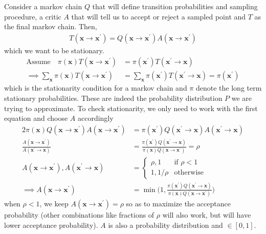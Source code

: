 \documentclass[../../statistical_learning_notes.tex]{subfiles}
\begin{document}
Consider a markov chain $Q$ that will define transition probabilities and sampling procedure, a critic $A$ that will tell us to accept or reject a sampled point and $T$ as the final markov chain. Then,
\begin{align*}
    T(\bm{x}\rightarrow \bm{x}^{\prime}) = Q(\bm{x} \rightarrow \bm{x}^{\prime})A(\bm{x} \rightarrow \bm{x}^{\prime})
\end{align*}
which we want to be stationary.
\begin{align*}
    \text{Assume} \quad \pi(\bm{x})T(\bm{x} \rightarrow \bm{x}^{\prime}) &= \pi(\bm{x}^{\prime})T(\bm{x}^{\prime} \rightarrow \bm{x})\\
    \implies \sum_{\bm{x}} \pi(\bm{x})T(\bm{x} \rightarrow \bm{x}^{\prime}) &= \sum_{\bm{x}} \pi(\bm{x}^{\prime})T(\bm{x}^{\prime} \rightarrow \bm{x}) = \pi(\bm{x}^{\prime})
\end{align*}
which is the stationarity condition for a markov chain and $\pi$ denote the long term stationary probabilities. These are indeed the probability distribution $P$ we are trying to approximate. To check stationarity, we only need to work with the first equation and choose $A$ accordingly
\begin{alignat*}{2}
    \pi(\bm{x})Q(\bm{x} \rightarrow \bm{x}^{\prime})A(\bm{x} \rightarrow \bm{x}^{\prime}) &= \pi(\bm{x}^{\prime})Q(\bm{x}^{\prime} \rightarrow \bm{x})A(\bm{x}^{\prime} \rightarrow \bm{x})\\
    \frac{A(\bm{x} \rightarrow \bm{x}^{\prime})}{A(\bm{x}^{\prime} \rightarrow \bm{x})} &= \frac{\pi(\bm{x}^{\prime})Q(\bm{x}^{\prime} \rightarrow \bm{x})}{\pi(\bm{x})Q(\bm{x} \rightarrow \bm{x}^{\prime})} = \rho\\
    A(\bm{x} \rightarrow \bm{x}^{\prime}), A(\bm{x}^{\prime} \rightarrow \bm{x}) &= \begin{cases} \rho, 1 &\mbox{if $\rho < 1$}\\
    1, 1/\rho &\mbox{otherwise} \end{cases}\\
    \implies A(\bm{x} \rightarrow \bm{x}^{\prime}) &= \min \bigg(1, \frac{\pi(\bm{x}^{\prime})Q(\bm{x}^{\prime} \rightarrow \bm{x})}{\pi(\bm{x})Q(\bm{x} \rightarrow \bm{x}^{\prime})}\bigg)
\end{alignat*}
when $\rho < 1$, we keep $A(\bm{x} \rightarrow \bm{x}^{\prime}) = \rho$ so as to maximize the acceptance probability (other combinations like fractions of $\rho$ will also work, but will have lower acceptance probability). $A$ is also a probability distribution and $\in [0,1]$.\newline
\end{document}
